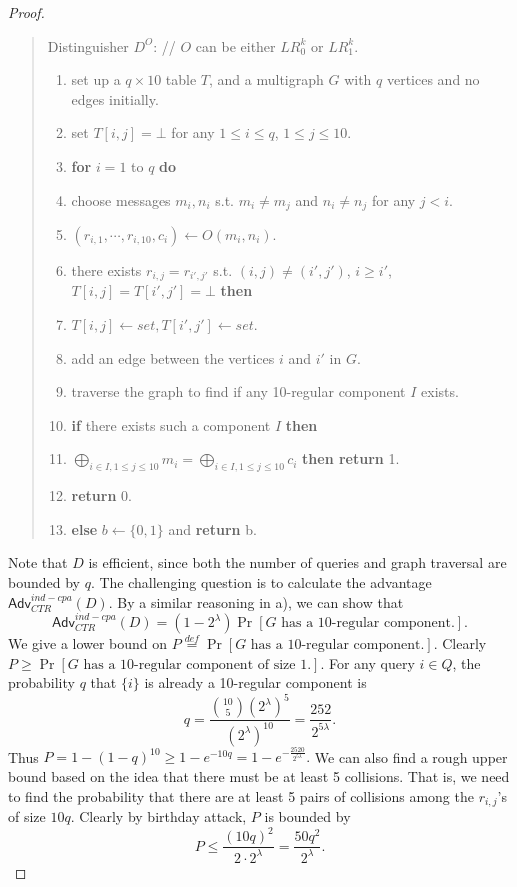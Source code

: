 \documentclass[12pt]{article}
\newcommand{\eqdef}{\stackrel{def}{=}}
\newcommand{\bits}{\{0,1\}}
\newcommand{\Adv}{\textsf{Adv}}
\newcommand{\tab}{\hspace{0.3in}}
\theoremstyle{definition}
\begin{document}
\begin{proof}
\begin{quote}
Distinguisher $D^O$: // $O$ can be either $LR_0^k$ or $LR_1^k$.
\begin{enumerate}
\item set up a $q\times 10$ table $T$, and a multigraph $G$ with $q$ vertices and no edges initially.
\item set $T[i,j]=\bot$ for any $1\leq i\leq q$, $1\leq j \leq 10$.
\item {\bf for} $i=1$ to $q$ {\bf do}
\item \tab choose messages $m_i, n_i$ s.t. $m_i \not= m_j$ and $n_i \not= n_j$ for any $j<i$.
\item \tab $(r_{i,1}, \cdots, r_{i,10}, c_i) \gets O(m_i, n_i)$.
\item \tab {\bf if} there exists $r_{i,j} = r_{i',j'}$ s.t. $(i,j)\not=(i',j')$, $i\geq i'$, $T[i,j]=T[i',j']=\bot$ {\bf then}
\item \tab \tab $T[i,j] \gets set, T[i',j'] \gets set$.
\item \tab \tab add an edge between the vertices $i$ and $i'$ in $G$.
\item traverse the graph to find if any 10-regular component $I$ exists.
\item {\bf if} there exists such a component $I$ {\bf then}
\item \tab {\bf if} $\bigoplus_{i \in I, 1\leq j \leq 10} m_i = \bigoplus_{i \in I, 1\leq j \leq 10} c_i$ {\bf then return} 1.
\item \tab {\bf else} {\bf return} 0.
\item {\bf else} $b\gets\bits$ and {\bf return} b.
\end{enumerate}
\end{quote}
Note that $D$ is efficient, since both the number of queries and graph traversal are bounded by $q$.
The challenging question is to calculate the advantage $\Adv_{CTR}^{ind-cpa}(D)$.
By a similar reasoning in a), we can show that
$$\Adv_{CTR}^{ind-cpa}(D) = (1-2^\lambda)\Pr[\textrm{$G$ has a 10-regular component.}].$$
We give a lower bound on $P \eqdef \Pr[\textrm{$G$ has a 10-regular component.}]$.
Clearly $P \geq \Pr[\textrm{$G$ has a 10-regular component of size 1.}]$.
For any query $i \in Q$, the probability $q$ that $\{i\}$ is already a 10-regular component is
$$q = \frac{\binom{10}{5}(2^\lambda)^5}{(2^\lambda)^{10}} = \frac{252}{2^{5\lambda}}.$$
Thus $P = 1-(1-q)^{10} \geq 1-e^{-10q}=1-e^{-\frac{2520}{2^{5\lambda}}}.$
We can also find a rough upper bound based on the idea that there must be at least 5 collisions. That is, we need to find the probability that there are at least 5 pairs of collisions among the $r_{i,j}$'s of size $10q$. Clearly by birthday attack, $P$ is bounded by
$$P \leq \frac{(10q)^2}{2\cdot 2^\lambda} = \frac{50q^2}{2^\lambda}.$$
\end{proof}
\end{document}

